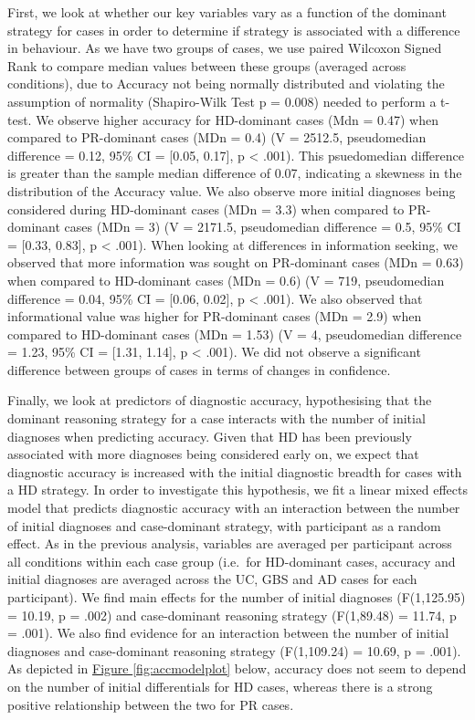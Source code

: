 \documentclass[a4paper, nobind]{templates/ociamthesis}
\begin{document}
\hfill\break
First, we look at whether our key variables vary as a function of the dominant strategy for cases in order to determine if strategy is associated with a difference in behaviour. As we have two groups of cases, we use paired Wilcoxon Signed Rank to compare median values between these groups (averaged across conditions), due to Accuracy not being normally distributed and violating the assumption of normality (Shapiro-Wilk Test p = 0.008) needed to perform a t-test. We observe higher accuracy for HD-dominant cases (Mdn = 0.47) when compared to PR-dominant cases (MDn = 0.4) (V = 2512.5, pseudomedian difference = 0.12, 95\% CI = {[}0.05, 0.17{]}, p \textless{} .001). This psuedomedian difference is greater than the sample median difference of 0.07, indicating a skewness in the distribution of the Accuracy value. We also observe more initial diagnoses being considered during HD-dominant cases (MDn = 3.3) when compared to PR-dominant cases (MDn = 3) (V = 2171.5, pseudomedian difference = 0.5, 95\% CI = {[}0.33, 0.83{]}, p \textless{} .001). When looking at differences in information seeking, we observed that more information was sought on PR-dominant cases (MDn = 0.63) when compared to HD-dominant cases (MDn = 0.6) (V = 719, pseudomedian difference = 0.04, 95\% CI = {[}0.06, 0.02{]}, p \textless{} .001). We also observed that informational value was higher for PR-dominant cases (MDn = 2.9) when compared to HD-dominant cases (MDn = 1.53) (V = 4, pseudomedian difference = 1.23, 95\% CI = {[}1.31, 1.14{]}, p \textless{} .001). We did not observe a significant difference between groups of cases in terms of changes in confidence.

\hfill\break
Finally, we look at predictors of diagnostic accuracy, hypothesising that the dominant reasoning strategy for a case interacts with the number of initial diagnoses when predicting accuracy. Given that HD has been previously associated with more diagnoses being considered early on, we expect that diagnostic accuracy is increased with the initial diagnostic breadth for cases with a HD strategy. In order to investigate this hypothesis, we fit a linear mixed effects model that predicts diagnostic accuracy with an interaction between the number of initial diagnoses and case-dominant strategy, with participant as a random effect. As in the previous analysis, variables are averaged per participant across all conditions within each case group (i.e.~for HD-dominant cases, accuracy and initial diagnoses are averaged across the UC, GBS and AD cases for each participant). We find main effects for the number of initial diagnoses (F(1,125.95) = 10.19, p = .002) and case-dominant reasoning strategy (F(1,89.48) = 11.74, p = .001). We also find evidence for an interaction between the number of initial diagnoses and case-dominant reasoning strategy (F(1,109.24) = 10.69, p = .001). As depicted in \hyperref[fig:accmodelplot]{Figure \ref{fig:accmodelplot}} below, accuracy does not seem to depend on the number of initial differentials for HD cases, whereas there is a strong positive relationship between the two for PR cases.
\end{document}
